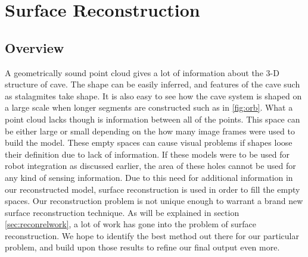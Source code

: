 \chapter{Surface Reconstruction}\label{chap:srecon}
\section{Overview}\label{sec:reconoverview}
A geometrically sound point cloud gives a lot of information about the 3\hyp D structure of cave. The shape can be easily inferred, and features of the cave such as stalagmites take shape. It is also easy to see how the cave system is shaped on a large scale when longer segments are constructed such as in \ref{fig:orb}. What a point cloud lacks though is information between all of the points. This space can be either large or small depending on the how many image frames were used to build the model. These empty spaces can cause visual problems if shapes loose their definition due to lack of information. If these models were to be used for robot integration as discussed earlier, the area of these holes cannot be used for any kind of sensing information. Due to this need for additional information in our reconstructed model, surface reconstruction is used in order to fill the empty spaces. Our reconstruction problem is not unique enough to warrant a brand new surface reconstruction technique. As will be explained in section \ref{sec:reconrelwork}, a lot of work has gone into the problem of surface reconstruction. We hope to identify the best method out there for our particular problem, and build upon those results to refine our final output even more. 


